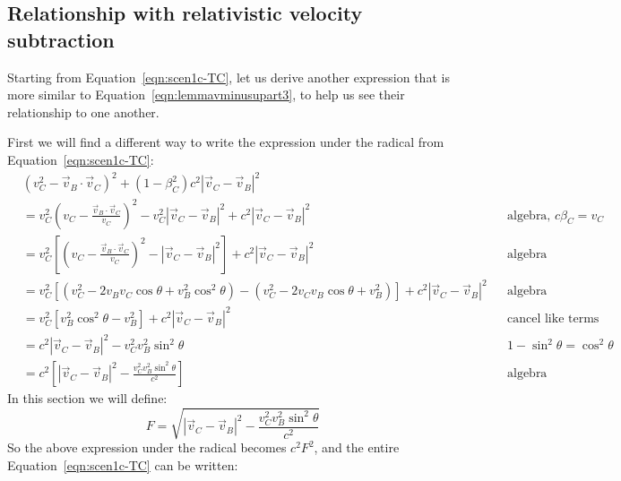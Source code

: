 \documentclass[a4paper]{article}
\theoremstyle{plain}
\theoremstyle{definition}
\newcommand{\vect}[1]{\vec{#1}}
\begin{document}
\subsection{Relationship with relativistic velocity subtraction}
\label{app:scen1c-Bsending-relvel}

Starting from Equation~\eqref{eqn:scen1c-TC}, let us derive another
expression that is more similar to
Equation~\eqref{eqn:lemmavminusupart3}, to help us see their
relationship to one another.

First we will find a different way to write the expression under the
radical from Equation~\eqref{eqn:scen1c-TC}:
\begin{align}
  & (v_C^2 - \vect{v}_B \cdot \vect{v}_C)^2  + (1-\beta_C^2)c^2 |\vect{v}_C - \vect{v}_B|^2 \nonumber \\
  & = v_C^2 (v_C - \frac{\vect{v}_B \cdot \vect{v}_C}{v_C})^2  - v_C^2 |\vect{v}_C - \vect{v}_B|^2 + c^2 |\vect{v}_C - \vect{v}_B|^2 & & \text{algebra, $c \beta_C = v_C$} \nonumber \\
  & = v_C^2 \left[ (v_C - \frac{\vect{v}_B \cdot \vect{v}_C}{v_C})^2  - |\vect{v}_C - \vect{v}_B|^2 \right] + c^2 |\vect{v}_C - \vect{v}_B|^2 & & \text{algebra} \nonumber \\
  & = v_C^2 \left[ (v_C^2 - 2 v_B v_C \cos \theta + v_B^2 \cos^2 \theta)  - (v_C^2 - 2 v_C v_B \cos \theta + v_B^2) \right] + c^2 |\vect{v}_C - \vect{v}_B|^2 & & \text{algebra} \nonumber \\
  & = v_C^2 \left[ v_B^2 \cos^2 \theta  - v_B^2 \right] + c^2 |\vect{v}_C - \vect{v}_B|^2 & & \text{cancel like terms} \nonumber \\
  & = c^2 |\vect{v}_C - \vect{v}_B|^2 - v_C^2 v_B^2 \sin^2 \theta & & \text{$1-\sin^2 \theta = \cos^2 \theta$} \nonumber \\
  & = c^2 \left[ |\vect{v}_C - \vect{v}_B|^2 - \frac{v_C^2 v_B^2 \sin^2 \theta}{c^2} \right] & & \text{algebra} \nonumber
\end{align}
In this section we will define:
\begin{equation}
F = \sqrt{ |\vect{v}_C - \vect{v}_B|^2 - \frac{v_C^2 v_B^2 \sin^2 \theta}{c^2} } \label{eqn:scen1c-F}
\end{equation}
So the above expression under the radical becomes $c^2 F^2$,
and the entire Equation~\eqref{eqn:scen1c-TC} can be written:
\end{document}
